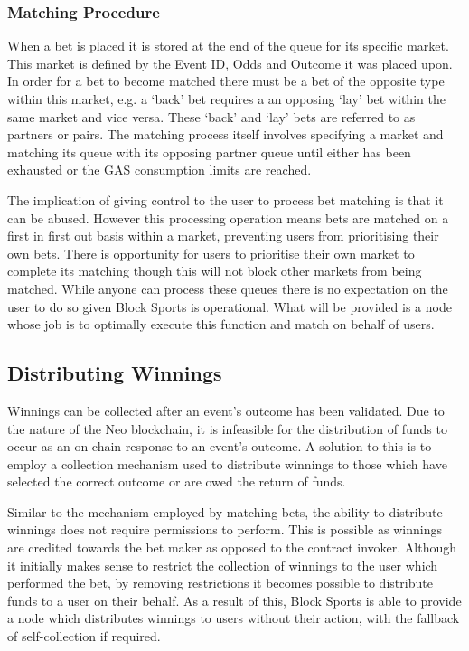 \documentclass{article}
\begin{document}
\subsubsection{Matching Procedure}
When a bet is placed it is stored at the end of the queue for its specific market. This market is defined by the Event ID, Odds and Outcome it was placed upon. In order for a bet to become matched there must be a bet of the opposite type within this market, e.g. a ‘back’ bet requires a an opposing ‘lay’ bet within the same market and vice versa. These ‘back’ and ‘lay’ bets are referred to as partners or pairs. The matching process itself involves specifying a market and matching its queue with its opposing partner queue until either has been exhausted or the GAS consumption limits are reached. 

The implication of giving control to the user to process bet matching is that it can be abused. However this processing operation means bets are matched on a first in first out basis within a market, preventing users from prioritising their own bets. There is opportunity for users to prioritise their own market to complete its matching though this will not block other markets from being matched. While anyone can process these queues there is no expectation on the user to do so given Block Sports is operational. What will be provided is a node whose job is to optimally execute this function and match on behalf of users. 


	\subsection{Distributing Winnings}
Winnings can be collected after an event’s outcome has been validated. Due to the nature of the Neo blockchain, it is infeasible for the distribution of funds to occur as an on-chain response to an event’s outcome. A solution to this is to employ a collection mechanism used to distribute winnings to those which have selected the correct outcome or are owed the return of funds.

Similar to the mechanism employed by matching bets, the ability to distribute winnings does not require permissions to perform. This is possible as winnings are credited towards the bet maker as opposed to the contract invoker. Although it initially makes sense to restrict the collection of winnings to the user which performed the bet, by removing restrictions it becomes possible to distribute funds to a user on their behalf. As a result of this, Block Sports is able to provide a node which distributes winnings to users without their action, with the fallback of self-collection if required.
		
\end{document}
